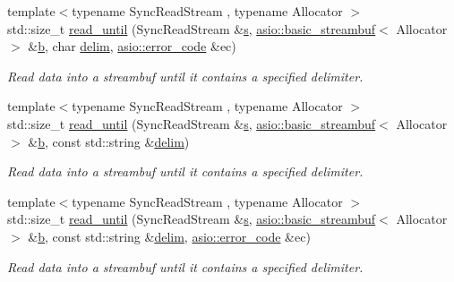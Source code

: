 \begin{DoxyCompactItemize}
{\footnotesize template$<$typename Sync\+Read\+Stream , typename Allocator $>$ }\\std\+::size\+\_\+t \hyperlink{group__read__until_gab9d265cc5b757caf9c9a602da2d6a3e5}{read\+\_\+until} (Sync\+Read\+Stream \&\hyperlink{group__async__connect_ga31ab74b9ea6c77932dddd016cfc7920a}{s}, \hyperlink{classasio_1_1basic__streambuf}{asio\+::basic\+\_\+streambuf}$<$ Allocator $>$ \&\hyperlink{group__async__read_ga945a5c18fa77a9e2eba420f8f44b2a4f}{b}, char \hyperlink{group__async__read__until_gafbf62a75ad736aff941c1f70d4b3c223}{delim}, \hyperlink{classasio_1_1error__code}{asio\+::error\+\_\+code} \&ec)
\begin{DoxyCompactList}\small\item\em Read data into a streambuf until it contains a specified delimiter. \end{DoxyCompactList}\item 
{\footnotesize template$<$typename Sync\+Read\+Stream , typename Allocator $>$ }\\std\+::size\+\_\+t \hyperlink{group__read__until_ga6f38642ad22fcb7f72ddc9fd2b586541}{read\+\_\+until} (Sync\+Read\+Stream \&\hyperlink{group__async__connect_ga31ab74b9ea6c77932dddd016cfc7920a}{s}, \hyperlink{classasio_1_1basic__streambuf}{asio\+::basic\+\_\+streambuf}$<$ Allocator $>$ \&\hyperlink{group__async__read_ga945a5c18fa77a9e2eba420f8f44b2a4f}{b}, const std\+::string \&\hyperlink{group__async__read__until_gafbf62a75ad736aff941c1f70d4b3c223}{delim})
\begin{DoxyCompactList}\small\item\em Read data into a streambuf until it contains a specified delimiter. \end{DoxyCompactList}\item 
{\footnotesize template$<$typename Sync\+Read\+Stream , typename Allocator $>$ }\\std\+::size\+\_\+t \hyperlink{group__read__until_ga27386e9b95114d7def2feee77e2dfd93}{read\+\_\+until} (Sync\+Read\+Stream \&\hyperlink{group__async__connect_ga31ab74b9ea6c77932dddd016cfc7920a}{s}, \hyperlink{classasio_1_1basic__streambuf}{asio\+::basic\+\_\+streambuf}$<$ Allocator $>$ \&\hyperlink{group__async__read_ga945a5c18fa77a9e2eba420f8f44b2a4f}{b}, const std\+::string \&\hyperlink{group__async__read__until_gafbf62a75ad736aff941c1f70d4b3c223}{delim}, \hyperlink{classasio_1_1error__code}{asio\+::error\+\_\+code} \&ec)
\begin{DoxyCompactList}\small\item\em Read data into a streambuf until it contains a specified delimiter. \end{DoxyCompactList}\item 

\end{DoxyCompactItemize}
